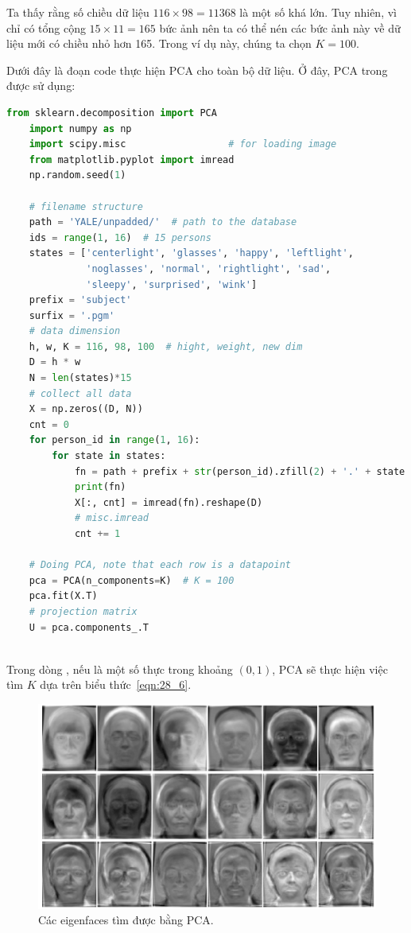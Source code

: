 Ta thấy rằng số chiều dữ liệu $116 \times 98 = 11368$ là một số khá
lớn. Tuy nhiên, vì chỉ có tổng cộng $15 \times 11 = 165$ bức ảnh nên ta có thể
nén các bức ảnh này về dữ liệu mới có chiều nhỏ hơn 165. Trong ví dụ này, chúng
ta chọn $K = 100$.

Dưới đây là đoạn code thực hiện PCA cho toàn bộ dữ liệu. Ở đây, PCA trong  được sử dụng:
\newpage
\begin{lstlisting}[language=Python]
    from sklearn.decomposition import PCA
    import numpy as np
    import scipy.misc                  # for loading image
    from matplotlib.pyplot import imread
    np.random.seed(1)
    
    # filename structure
    path = 'YALE/unpadded/'  # path to the database
    ids = range(1, 16)  # 15 persons
    states = ['centerlight', 'glasses', 'happy', 'leftlight',
              'noglasses', 'normal', 'rightlight', 'sad',
              'sleepy', 'surprised', 'wink']
    prefix = 'subject'
    surfix = '.pgm'
    # data dimension
    h, w, K = 116, 98, 100  # hight, weight, new dim
    D = h * w
    N = len(states)*15
    # collect all data
    X = np.zeros((D, N))
    cnt = 0
    for person_id in range(1, 16):
        for state in states:
            fn = path + prefix + str(person_id).zfill(2) + '.' + state + surfix
            print(fn)
            X[:, cnt] = imread(fn).reshape(D)
            # misc.imread
            cnt += 1
    
    # Doing PCA, note that each row is a datapoint
    pca = PCA(n_components=K)  # K = 100
    pca.fit(X.T)
    # projection matrix
    U = pca.components_.T
    
\end{lstlisting}

Trong dòng , nếu
 là một số thực trong khoảng $(0, 1)$, PCA sẽ thực
hiện việc tìm $K$ dựa trên biểu thức~\eqref{eqn:28_6}.

\begin{figure}[t]
    \centering
    \includegraphics[width = \textwidth]{Chapters/07_DimemsionalityReduction/28_pca2/latex/yaleb_eig.pdf}
    \caption[]{Các eigenfaces tìm được bằng PCA.}
    \label{fig:28_2}
\end{figure}

